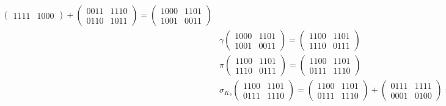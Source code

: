 \documentclass[fleqn]{article}
\begin{document}
\begin{equation*}
\begin{aligned}
\begin{pmatrix}
                1111 & 1000
            \end{pmatrix} +
            \begin{pmatrix}
                0011 & 1110 \\
                0110 & 1011
            \end{pmatrix} =
            \begin{pmatrix}
                1000 & 1101 \\
                1001 & 0011
            \end{pmatrix} \\
            &\gamma \begin{pmatrix}
                1000 & 1101 \\
                1001 & 0011
            \end{pmatrix} =
            \begin{pmatrix}
                1100 & 1101 \\
                1110 & 0111
            \end{pmatrix} \\
            &\pi \begin{pmatrix}
                1100 & 1101 \\
                1110 & 0111
            \end{pmatrix} =
            \begin{pmatrix}
                1100 & 1101 \\
                0111 & 1110
            \end{pmatrix} \\
            &\sigma_{K_2} \begin{pmatrix}
                1100 & 1101 \\
                0111 & 1110
            \end{pmatrix} =
            \begin{pmatrix}
                1100 & 1101 \\
                0111 & 1110
            \end{pmatrix} +
            \begin{pmatrix}
                0111 & 1111 \\
                0001 & 0100
            \end{pmatrix} =
            \begin{pmatrix}
                1011 & 0010 \\
                0110 & 1010
            \end{pmatrix} \\
        \end{aligned}
    \end{equation*}
\end{document}
